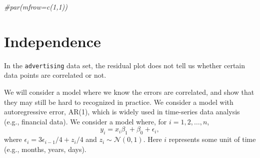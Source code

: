 \documentclass[12pt,]{book}
\newenvironment{Shaded}{\begin{snugshade}}{\end{snugshade}}
\newcommand{\KeywordTok}[1]{\textcolor[rgb]{0.13,0.29,0.53}{\textbf{#1}}}
\newcommand{\DataTypeTok}[1]{\textcolor[rgb]{0.13,0.29,0.53}{#1}}
\newcommand{\DecValTok}[1]{\textcolor[rgb]{0.00,0.00,0.81}{#1}}
\newcommand{\StringTok}[1]{\textcolor[rgb]{0.31,0.60,0.02}{#1}}
\newcommand{\CommentTok}[1]{\textcolor[rgb]{0.56,0.35,0.01}{\textit{#1}}}
\newcommand{\OperatorTok}[1]{\textcolor[rgb]{0.81,0.36,0.00}{\textbf{#1}}}
\newcommand{\NormalTok}[1]{#1}
\begin{document}
\begin{Shaded}
\begin{Highlighting}[]
\CommentTok{#par(mfrow=c(1,1))}
\end{Highlighting}
\end{Shaded}

\section{Independence}\label{independence}

In the \texttt{advertising} data set, the residual plot does not tell us
whether certain data points are correlated or not.

\begin{Shaded}
\end{Shaded}

We will consider a model where we know the errors are correlated, and
show that they may still be hard to recognized in practice. We consider
a model with autoregressive error, AR(1), which is widely used in
time-series data analysis (e.g., financial data). We consider a model
where, for \(i=1,2,\ldots, n\),
\[ y_i = x_i \beta_1 + \beta_0 + \epsilon_i,\] where
\(\epsilon_i = 3\epsilon_{i-1}/4 + z_i/4\) and
\(z_i\sim \mathcal{N}(0,1)\). Here \(i\) represents some unit of time
(e.g., months, years, days).
\end{document}

